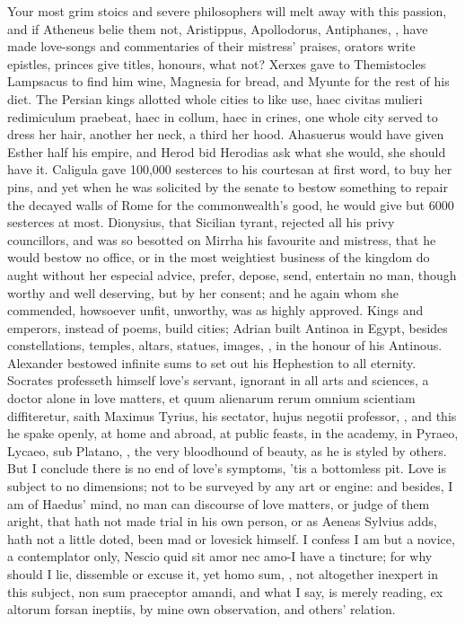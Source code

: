 {Your most grim stoics and severe philosophers will melt away with this
passion, and if Atheneus belie them not, Aristippus, Apollodorus,
Antiphanes, \etc{}, have made love-songs and commentaries of their
mistress' praises, orators write epistles, princes give titles,
honours, what not? Xerxes gave to Themistocles Lampsacus to find
him wine, Magnesia for bread, and Myunte for the rest of his diet. The
Persian kings allotted whole cities to like use, haec civitas
mulieri redimiculum praebeat, haec in collum, haec in crines, one whole
city served to dress her hair, another her neck, a third her hood.
Ahasuerus would have given Esther half his empire, and
Herod bid Herodias ask what she would, she should have it.
Caligula gave 100,000 sesterces to his courtesan at first word, to buy
her pins, and yet when he was solicited by the senate to bestow
something to repair the decayed walls of Rome for the commonwealth's
good, he would give but 6000 sesterces at most. Dionysius, that
Sicilian tyrant, rejected all his privy councillors, and was so
besotted on Mirrha his favourite and mistress, that he would bestow no
office, or in the most weightiest business of the kingdom do aught
without her especial advice, prefer, depose, send, entertain no man,
though worthy and well deserving, but by her consent; and he again whom
she commended, howsoever unfit, unworthy, was as highly approved. Kings
and emperors, instead of poems, build cities; Adrian built Antinoa in
Egypt, besides constellations, temples, altars, statues, images, \etc{},
in the honour of his Antinous. Alexander bestowed infinite sums to set
out his Hephestion to all eternity. Socrates professeth himself
love's servant, ignorant in all arts and sciences, a doctor alone in
love matters, et quum alienarum rerum omnium scientiam diffiteretur,
saith Maximus Tyrius, his sectator, hujus negotii professor, \etc{},
and this he spake openly, at home and abroad, at public feasts, in the
academy, in Pyraeo, Lycaeo, sub Platano, \etc{}, the very bloodhound of
beauty, as he is styled by others. But I conclude there is no end of
love's symptoms, 'tis a bottomless pit. Love is subject to no
dimensions; not to be surveyed by any art or engine: and besides, I am
of Haedus' mind, no man can discourse of love matters, or judge
of them aright, that hath not made trial in his own person, or as
Aeneas Sylvius adds, hath not a little doted, been mad or
lovesick himself. I confess I am but a novice, a contemplator only,
Nescio quid sit amor nec amo-I have a tincture; for why should I
lie, dissemble or excuse it, yet homo sum, \etc{}, not altogether inexpert
in this subject, non sum praeceptor amandi, and what I say, is merely
reading, ex altorum forsan ineptiis, by mine own observation, and
others' relation.

}
